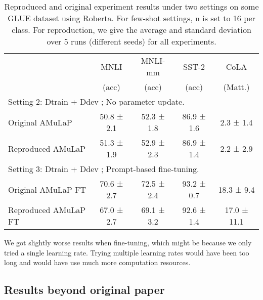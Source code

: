 \begin{table}[h!]
\centering
{%
\begin{tabular}{|l| c c c c|}

 \hline
  & MNLI & MNLI-mm & SST-2 & CoLA\\ 
  & (acc) & (acc) & (acc) & (Matt.)\\[0.5ex] 
 \hline
 \multicolumn{5}{|l|}{Setting 2: Dtrain + Ddev ; No parameter update.} \\
 \hline
 Original AMuLaP & 50.8 ± 2.1 & 52.3 ± 1.8 & 86.9 ± 1.6 & 2.3 ± 1.4 \\
 Reproduced AMuLaP & 51.3 ± 1.9 & 52.9 ± 2.3 & 86.9 ± 1.4 & 2.2 ± 2.9 \\
 \hline
 \multicolumn{5}{|l|}{Setting 3: Dtrain + Ddev ; Prompt-based fine-tuning.} \\
 \hline
 Original AMuLaP FT & 70.6 ± 2.7 & 72.5 ± 2.4 & 93.2 ± 0.7 & 18.3 ± 9.4 \\
 Reproduced AMuLaP FT & 67.0 ± 2.7 & 69.1 ± 3.2 & 92.6 ± 1.4 & 17.0 ± 11.1 \\ [0.1ex] 
 \hline
\end{tabular}}
\caption{Reproduced and original experiment results under two settings on some GLUE dataset using Roberta. For few-shot settings, n is set to 16 per class. For reproduction, we give the average and standard deviation over 5 runs (different seeds) for all experiments.}
\label{table:GLUEResults}
\end{table}

We got slightly worse results when fine-tuning, which might be because we only tried a single learning rate. Trying multiple learning rates would have been too long and would have use much more computation resources.


\subsection{Results beyond original paper}

